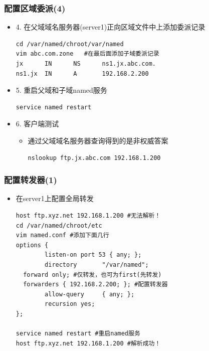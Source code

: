 \documentclass[xcolor=svgnames,presentation]{beamer}
\begin{document}
\begin{frame}[fragile]
\frametitle{配置区域委派(4)}
\label{sec-1-19}
\begin{itemize}

\item 4. 在父域域名服务器(server1)正向区域文件中上添加委派记录\\
\label{sec-1-19-1}%
\begin{verbatim}
cd /var/named/chroot/var/named
vim abc.com.zone   #在最后面添加子域委派记录
jx      IN      NS      ns1.jx.abc.com.
ns1.jx  IN      A       192.168.2.200
\end{verbatim}

\item 5. 重启父域和子域named服务\\
\label{sec-1-19-2}%
\begin{verbatim}
service named restart
\end{verbatim}

\item 6. 客户端测试
\label{sec-1-19-3}%
\begin{itemize}

\item 通过父域域名服务器查询得到的是非权威答案\\
\label{sec-1-19-3-1}%
\begin{verbatim}
nslookup ftp.jx.abc.com 192.168.1.200
\end{verbatim}
\end{itemize} %
\end{itemize} %
\end{frame}
\begin{frame}[fragile]
\frametitle{配置转发器(1)}
\label{sec-1-20}
\begin{itemize}

\item 在server1上配置全局转发\\
\label{sec-1-20-1}%
\begin{verbatim}
host ftp.xyz.net 192.168.1.200 #无法解析！
cd /var/named/chroot/etc
vim named.conf #添加下面几行
options {
        listen-on port 53 { any; };
        directory       "/var/named";
  forward only; #仅转发，也可为first(先转发)
  forwarders { 192.168.2.200; }; #配置转发器
        allow-query     { any; };
        recursion yes;
};

service named restart #重启named服务
host ftp.xyz.net 192.168.1.200 #解析成功！
\end{verbatim}
\end{itemize} %
\end{frame}
\end{document}
